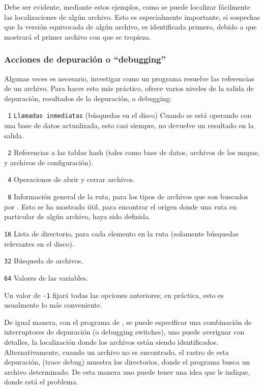 \documentclass{article}
\begin{document}
Debe ser evidente, mediante estos ejemplos, como se puede localizar fácilmente las
localizaciones de algún archivo. Esto es especialmente importante, si sospechas que la
versión equivocada de algún archivo, es identificada primero, debido a que
 mostrará el primer archivo con que se tropieza. 

\subsubsection{Acciones de depuración o ``debugging''}
\label{sec:debugging}

Algunas veces es necesario, investigar como un programa resuelve las referencias de un
archivo. Para hacer esto más práctico, \KPS{} ofrece varios niveles de
la salida de depuración, resultados de la depuración, o debugging:
 \begin{ttdescription} \item[\texttt{\ 1}] \texttt{Llamadas
			 inmediatas} (búsquedas en el disco)
			 Cuando se está operando con una
			 base de datos 
			 actualizada, esto casi siempre, no
			 devuelve un resultado en la salida.
		 \item[\texttt{\ 2}] Referencias a las
			 tablas hash (tales como 
			 base de datos, archivos de los
			 mapas, y archivos de
			 configuración).  \item[\texttt{\
			 4}] Operaciones de abrir y cerrar
		 archivos.  \item[\texttt{\ 8}] Información
			 general de la ruta, para los tipos
			 de archivos que son buscados por
			 \KPS{}. Esto se ha mostrado útil,
			 para encontrar el origen donde una ruta en
			 particular de algún archivo, haya
			 sido definida.  \item[\texttt{16}]
			 Lista de directorio, para cada
		 elemento en la ruta (solamente búsquedas
	 relevantes en el disco).  \item[\texttt{32}]
	 Búsqueda de archivos.  \item[\texttt{64}] Valores
		 de las variables.  
 \end{ttdescription}
 Un valor de \texttt{-1} fijará todas las opciones
 anteriores; en práctica, esto es usualmente lo más
 conveniente. 

 De igual manera, con el programa de , se
 puede especificar una combinación de interruptores de
 depuración (o debugging switches), uno puede averiguar con
 detalles, la localización donde los archivos están siendo
 identificados. Alternativamente, cuando un archivo no es
 encontrado, el rastro de esta depuración, (trace debug)
 muestra los directorios, donde el programa busca un archivo
 determinado. De esta manera uno puede tener una
 idea que le indique, donde está el problema.
\end{document}
